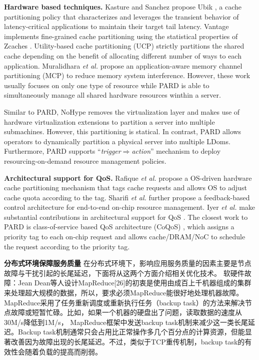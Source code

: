 \textbf{Hardware based techniques.} Kasture and Sanchez propose Ubik \cite{kasture_ubik:_2014},
a cache partitioning policy that characterizes and leverages the transient
behavior of latency-critical applications to maintain their target tail latency.
Vantage \cite{sanchez_vantage:_2011} implements fine-grained cache partitioning
using the statistical properties of Zcaches \cite{sanchez_zcache:_2010}.
Utility-based cache partitioning (UCP) \cite{qureshi_utility-based_2006}
strictly partitions the shared cache depending on the benefit of allocating
different number of ways to each application.
Muralidhara \emph{et al.} propose an application-aware memory channel
partitioning (MCP) \cite{muralidhara_reducing_2011} to reduce memory system
interference. However, these work usually focuses on only one type of resource while
PARD is able to simultaneously manage all shared hardware resources winthin a server.

Similar to PARD, NoHype \cite{keller_nohype:_2010} removes the virtualization layer
and makes use of hardware virtualization extensions to partition a server into multiple
submachines. However, this partitioning is statical.
In contrast, PARD allows operators to dynamically partition a physical server into
multiple LDoms. Furthermore, PARD supports ``\emph{trigger$\Rightarrow$action}''
mechanism to deploy resourcing-on-demand resource management policies.


\textbf{Architectural support for QoS.}
Rafique \emph{et al.} \cite{Rafique:2006:ASO} propose a OS-driven hardware cache partitioning mechanism that tags
cache requests and allows OS to adjust cache quota according to the tag.
Sharifi \emph{et al.} \cite{sharifi_mete:_2011} further propose a feedback-based
 control architecture for end-to-end on-chip resource management.
Iyer \emph{et al.} make substantial contributions in architectural
support for QoS \cite{herdrich_rate-based_2009, iyer_cqos:_2004, iyer_qos_2007,li_coqos:_2011,li_dynamic_2012}.
The closest work to PARD is class-of-service based QoS architecture (CoQoS) \cite{li_dynamic_2012, li_coqos:_2011},
which assigns a priority tag to each on-chip request and allows cache/DRAM/NoC to
schedule the request according to the priority tag.

\textbf{分布式环境保障服务质量}
在分布式环境下，影响应用服务质量的因素主要是节点故障与干扰引起的长尾延迟，下面将从这两个方面介绍相关优化技术。
软硬件故障：Jean Dean等人设计MapReduce[26]的初衷是使用由成百上千机器组成的集群来处理超大规模的数据，所以，要求必须MapReduce能很好地处理机器故障。MapReduce采用了任务重新调度或重新执行任务（backup task）的方法来解决节点故障或短暂忙碌。比如，如果一个机器的硬盘出了问题，读取数据的速度从30M/s降低到1M/s， MapReduce框架中发送backup task机制来减少这一类长尾延迟。Backup task机制通常只会占用比正常操作多几个百分点的计算资源，但能显著改善因为故障出现的长尾延迟。不过，类似于TCP重传机制，backup task的有效性会随着负载的提高而削弱。

